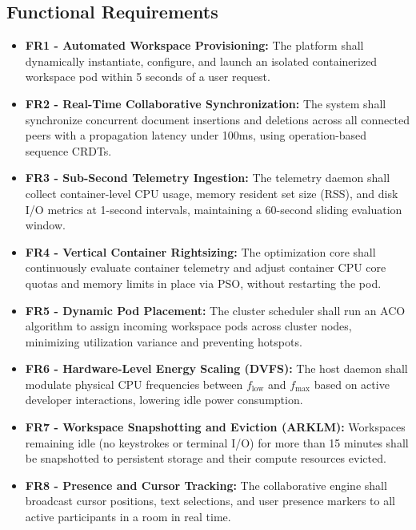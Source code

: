 \documentclass[12pt,a4paper]{report}
\begin{document}
\subsection{Functional Requirements}
\begin{itemize}
    \item \textbf{FR1 - Automated Workspace Provisioning:} The platform shall dynamically instantiate, configure, and launch an isolated containerized workspace pod within 5 seconds of a user request.
    \item \textbf{FR2 - Real-Time Collaborative Synchronization:} The system shall synchronize concurrent document insertions and deletions across all connected peers with a propagation latency under 100ms, using operation-based sequence CRDTs.
    \item \textbf{FR3 - Sub-Second Telemetry Ingestion:} The telemetry daemon shall collect container-level CPU usage, memory resident set size (RSS), and disk I/O metrics at 1-second intervals, maintaining a 60-second sliding evaluation window.
    \item \textbf{FR4 - Vertical Container Rightsizing:} The optimization core shall continuously evaluate container telemetry and adjust container CPU core quotas and memory limits in place via PSO, without restarting the pod.
    \item \textbf{FR5 - Dynamic Pod Placement:} The cluster scheduler shall run an ACO algorithm to assign incoming workspace pods across cluster nodes, minimizing utilization variance and preventing hotspots.
    \item \textbf{FR6 - Hardware-Level Energy Scaling (DVFS):} The host daemon shall modulate physical CPU frequencies between $f_{\text{low}}$ and $f_{\max}$ based on active developer interactions, lowering idle power consumption.
    \item \textbf{FR7 - Workspace Snapshotting and Eviction (ARKLM):} Workspaces remaining idle (no keystrokes or terminal I/O) for more than 15 minutes shall be snapshotted to persistent storage and their compute resources evicted.
    \item \textbf{FR8 - Presence and Cursor Tracking:} The collaborative engine shall broadcast cursor positions, text selections, and user presence markers to all active participants in a room in real time.
\end{itemize}
\end{document}
